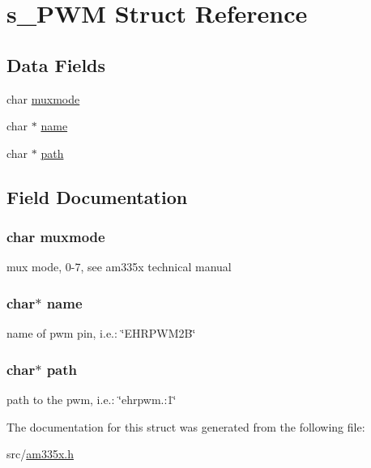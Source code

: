\hypertarget{structs___p_w_m}{\section{s\-\_\-\-P\-W\-M Struct Reference}
\label{structs___p_w_m}
}
\subsection*{Data Fields}
\begin{DoxyCompactItemize}
\item 
char \hyperlink{structs___p_w_m_a29c76b00b745b2dd207ac576dcb658c3}{muxmode}
\item 
char $\ast$ \hyperlink{structs___p_w_m_a5ac083a645d964373f022d03df4849c8}{name}
\item 
char $\ast$ \hyperlink{structs___p_w_m_a44196e6a5696d10442c29e639437196e}{path}
\end{DoxyCompactItemize}


\subsection{Field Documentation}
\hypertarget{structs___p_w_m_a29c76b00b745b2dd207ac576dcb658c3}{
\subsubsection[{muxmode}]{\setlength{\rightskip}{0pt plus 5cm}char muxmode}}\label{structs___p_w_m_a29c76b00b745b2dd207ac576dcb658c3}
mux mode, 0-\/7, see am335x technical manual \hypertarget{structs___p_w_m_a5ac083a645d964373f022d03df4849c8}{
\subsubsection[{name}]{\setlength{\rightskip}{0pt plus 5cm}char$\ast$ name}}\label{structs___p_w_m_a5ac083a645d964373f022d03df4849c8}
name of pwm pin, i.\-e.\-: \char`\"{}\-E\-H\-R\-P\-W\-M2\-B\char`\"{} \hypertarget{structs___p_w_m_a44196e6a5696d10442c29e639437196e}{
\subsubsection[{path}]{\setlength{\rightskip}{0pt plus 5cm}char$\ast$ path}}\label{structs___p_w_m_a44196e6a5696d10442c29e639437196e}
path to the pwm, i.\-e.\-: \char`\"{}ehrpwm.\-:1\char`\"{} 

The documentation for this struct was generated from the following file\-:\begin{DoxyCompactItemize}
\item 
src/\hyperlink{am335x_8h}{am335x.\-h}\end{DoxyCompactItemize}
